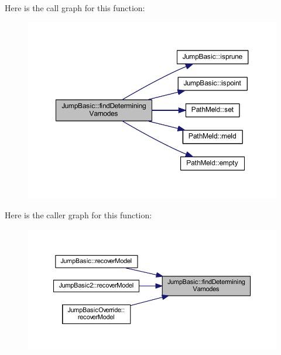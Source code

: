 Here is the call graph for this function\+:
\nopagebreak
\begin{figure}[H]
\begin{center}
\leavevmode
\includegraphics[width=350pt]{class_jump_basic_a4a9fc453c42caeb6857b80d4e216d544_cgraph}
\end{center}
\end{figure}
Here is the caller graph for this function\+:
\nopagebreak
\begin{figure}[H]
\begin{center}
\leavevmode
\includegraphics[width=350pt]{class_jump_basic_a4a9fc453c42caeb6857b80d4e216d544_icgraph}
\end{center}
\end{figure}
\mbox{\label{class_jump_basic_aefc7762595790f46334f6e09a88e4432}} 
